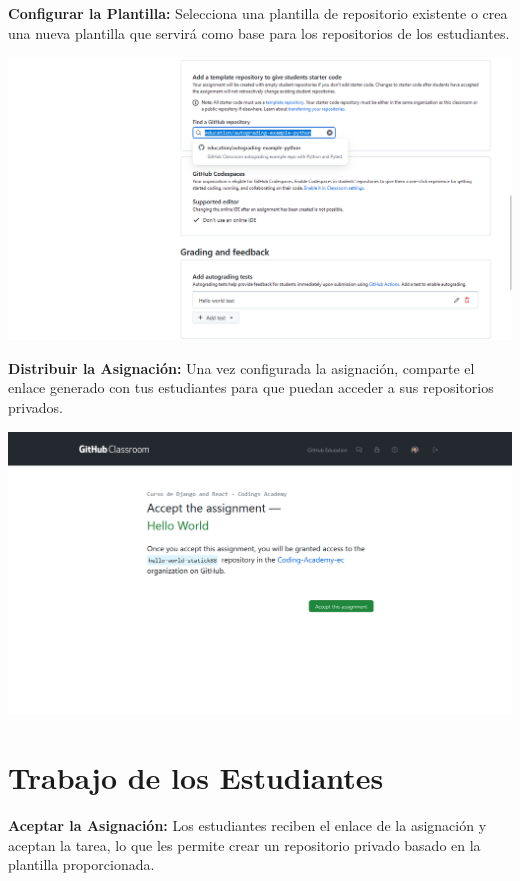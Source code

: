 \documentclass[
  a4paper,
  DIV=11,
  numbers=noendperiod,
  onepage,
  openany]{scrreprt}
\begin{document}
\textbf{Configurar la Plantilla:} Selecciona una plantilla de
repositorio existente o crea una nueva plantilla que servirá como base
para los repositorios de los estudiantes.

\begin{center}
\includegraphics{unidades/unidad0/images/paste-3.png}
\end{center}

\textbf{Distribuir la Asignación:} Una vez configurada la asignación,
comparte el enlace generado con tus estudiantes para que puedan acceder
a sus repositorios privados.

\begin{center}
\includegraphics{unidades/unidad0/images/paste-4.png}
\end{center}

\section{Trabajo de los Estudiantes
🧑‍💻}\label{trabajo-de-los-estudiantes}

\textbf{Aceptar la Asignación:} Los estudiantes reciben el enlace de la
asignación y aceptan la tarea, lo que les permite crear un repositorio
privado basado en la plantilla proporcionada.
\end{document}
